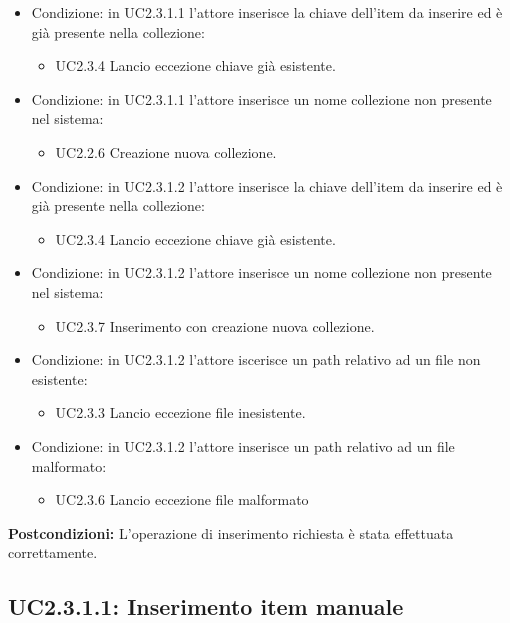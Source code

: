 \documentclass{scalatekids-article}
\begin{document}
\begin{itemize}
\item Condizione: in UC2.3.1.1  l'attore inserisce la chiave dell'item da inserire ed è già presente nella collezione:
  \begin{itemize}
  \item UC2.3.4 Lancio eccezione chiave già esistente.
  \end{itemize}
\item Condizione: in UC2.3.1.1 l'attore inserisce un nome collezione non presente nel sistema:
  \begin{itemize}
  \item UC2.2.6 Creazione nuova collezione. %
  \end{itemize}
\item Condizione: in UC2.3.1.2  l'attore inserisce la chiave dell'item da inserire ed è già presente nella collezione:
  \begin{itemize}
  \item UC2.3.4 Lancio eccezione chiave già esistente.
  \end{itemize}
\item Condizione: in UC2.3.1.2 l'attore inserisce un nome collezione non presente nel sistema:
  \begin{itemize}
  \item UC2.3.7 Inserimento con creazione nuova collezione.
  \end{itemize}
\item Condizione: in UC2.3.1.2 l'attore iscerisce un path relativo ad un file non esistente:
  \begin{itemize}
  \item UC2.3.3 Lancio eccezione file inesistente.
  \end{itemize}
\item Condizione: in UC2.3.1.2 l'attore inserisce un path relativo ad un file malformato: %
  \begin{itemize}
  \item UC2.3.6 Lancio eccezione file malformato
  \end{itemize}
\end{itemize}
\textbf{Postcondizioni:} L'operazione di inserimento richiesta è stata effettuata correttamente.

\subsection{UC2.3.1.1: Inserimento item manuale}
\end{document}
